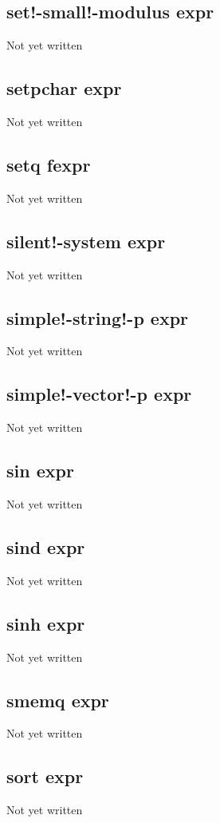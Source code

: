 \documentclass[a4paper,11pt]{article}
\begin{document}
{\subsection{\ttfamily set!-small!-modulus expr}
Not yet written

\subsection{\ttfamily setpchar expr}
Not yet written

\subsection{\ttfamily setq fexpr}
Not yet written

\subsection{\ttfamily silent!-system expr}
Not yet written

\subsection{\ttfamily simple!-string!-p expr}
Not yet written

\subsection{\ttfamily simple!-vector!-p expr}
Not yet written

\subsection{\ttfamily sin expr}
Not yet written

\subsection{\ttfamily sind expr}
Not yet written

\subsection{\ttfamily sinh expr}
Not yet written

\subsection{\ttfamily smemq expr}
Not yet written

\subsection{\ttfamily sort expr}
Not yet written

}
\end{document}
